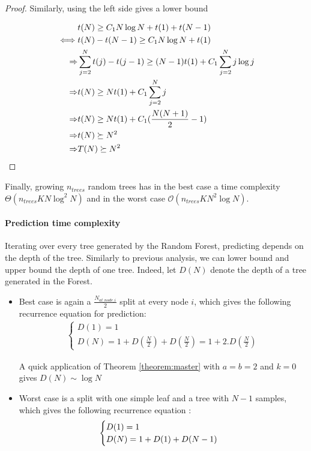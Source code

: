 \documentclass[english,11pt,openany]{article}
\theoremstyle{definition}
\newcommand{\bigO}{\mathcal{O}}
\theoremstyle{plain}
\theoremstyle{definition}
\begin{document}
\begin{appendices}
\begin{proof}
	Similarly, using the left side gives a lower bound 
	
	\begin{align}
	& t(N) \geq C_1 N\log N + t(1) + t(N-1)\notag \\
	\iff &  t(N) - t(N-1) \geq C_1 N\log N + t(1) \notag\\
	\Rightarrow & \sum_{j=2}^{N}  t(j) - t(j-1) \geq (N-1)t(1) + C_1\sum_{j=2}^{N}j \log j \notag\\
	\Rightarrow & t(N) \geq N t(1) + C_1 \sum_{j=2}^{N}j \notag\\
	\Rightarrow & t(N) \geq Nt(1) + C_1 (\frac{N(N +1)}{2} - 1)\notag \\
	\Rightarrow & t(N) \succeq N^2 \notag \\
	\Rightarrow & T(N) \succeq N^2 \notag
	\end{align}
	
\end{proof}

Finally, growing $n_{trees}$ random trees has in the best case a time complexity $\Theta(n_{trees}KN\log^2 N)$ and in the worst case $\bigO (n_{trees} K N^2 \log N)$.

\paragraph{Prediction time complexity}

Iterating over every tree generated by the Random Forest, predicting depends on the depth of the tree. 
Similarly to previous analysis, we can lower bound and upper bound the depth of one tree. 
Indeed, let $D(N)$ denote the depth of a tree generated in the Forest. 

\begin{itemize}
	\item 
	Best case is again a $\frac{N_{at\_node\_i}}{2}$ split at every node $i$,  which gives the following recurrence equation for prediction: 
	\begin{align}
	\begin{cases}
	D(1) = 1 \\
	D(N) = 1 + D(\frac{N}{2}) + D(\frac{N}{2}) = 1 + 2.D(\frac{N}{2})
	\end{cases}
	\end{align}
	
	A quick application of Theorem \ref{theorem:master} with $a=b=2$ and $k=0$ gives $D(N)\sim \log N$
	
	\item Worst case is a split with one simple leaf and a tree with $N-1$ samples, which gives the following recurrence equation : 
	\begin{align}
	\begin{cases}
	D(1) = 1 \\
	D(N) = 1 + D(1) + D(N-1) \notag
	\end{cases}
	\end{align}
	

\end{itemize}
\end{appendices}
\end{document}
